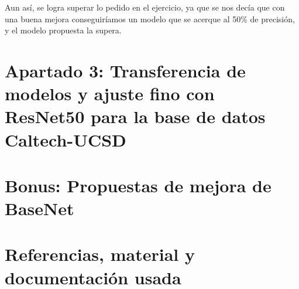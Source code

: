 \documentclass[12pt, spanish]{article}
\begin{document}
Aun así, se logra superar lo pedido en el ejercicio, ya que se nos decía que con una buena mejora conseguiríamos un modelo que se acerque al 50\% de precisión, y el modelo propuesta la supera.


\newpage

\section{Apartado 3: Transferencia de modelos y ajuste fino con ResNet50 para la base de datos Caltech-UCSD}

\section{Bonus: Propuestas de mejora de BaseNet}


\newpage

\section{Referencias, material y documentación usada}
\end{document}
